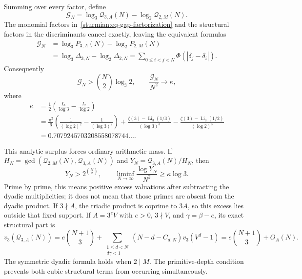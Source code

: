 \documentclass[11pt,oneside]{article}
\theoremstyle{definition}
\theoremstyle{remark}
\begin{document}
Summing over every factor, define
\begin{equation}
 \mathcal G_N=
 \log_3\mathcal Q_{3,A}(N)
 -\log_2\mathcal Q_{2,M}(N).
 \label{sturmian:eq-complete-surplus}
\end{equation}
The monomial factors in~\eqref{sturmian:eq-gap-factorization} and the structural factors in
the discriminants cancel exactly, leaving the equivalent formulas
\begin{align}
 \mathcal G_N
 &=\log_3 P_{3,A}(N)-\log_2 P_{2,M}(N)\nonumber\\
 &=\log_3\Delta_{3,N}-\log_2\Delta_{2,N}
 =\sum_{0\le i<j<N}\Phi(|\delta_j-\delta_i|).
 \label{sturmian:eq-surplus-identities}
\end{align}
Consequently
\begin{equation}
 \mathcal G_N>\binom N2\log_3 2,\qquad
 \frac{\mathcal G_N}{N^2}\longrightarrow\kappa,
 \label{sturmian:eq-surplus-limit}
\end{equation}
where
\begin{align}
 \kappa
 &=\frac12\left(\frac{I_3}{\log3}-\frac{I_2}{\log2}\right)\nonumber\\
 &=\frac{\pi^2}{6}\left(\frac1{(\log2)^2}-\frac1{(\log3)^2}\right)
 +\frac{\zeta(3)-\operatorname{Li}_3(1/3)}{(\log3)^3}
 -\frac{\zeta(3)-\operatorname{Li}_3(1/2)}{(\log2)^3}\nonumber\\
 &=0.7079245703208558078744\ldots.
 \label{sturmian:eq-kappa}
\end{align}

This analytic surplus forces ordinary arithmetic mass.  If
$H_N=\gcd(\mathcal Q_{2,M}(N),\mathcal Q_{3,A}(N))$ and
$Y_N=\mathcal Q_{3,A}(N)/H_N$, then
\begin{equation}
 Y_N>2^{\binom N2},\qquad
 \liminf_{N\to\infty}\frac{\log Y_N}{N^2}\ge\kappa\log3.
 \label{sturmian:eq-unmatched-quotient}
\end{equation}
Prime by prime, this means positive excess valuations after subtracting the dyadic
multiplicities; it does not mean that those primes are absent from the dyadic product.
If $3\nmid A$, the triadic product is coprime to $3A$, so this excess lies outside that fixed
support.  If $A=3^eV$ with $e>0$, $3\nmid V$, and $\gamma=\beta-e$, its exact structural part
is
\begin{equation}
 v_3(\mathcal Q_{3,A}(N))
 =e\binom{N+1}{3}
 +\sum_{\substack{1\le d<N\\d\gamma<1}}
 (N-d-C_{d,N})v_3(V^d-1)
 =e\binom{N+1}{3}+O_A(N).
 \label{sturmian:eq-structural-three}
\end{equation}
The symmetric dyadic formula holds when $2\mid M$.  The primitive-depth condition prevents
both cubic structural terms from occurring simultaneously.
\end{document}
